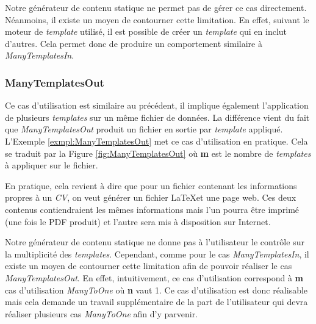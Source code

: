 			\begin{note}
				Notre générateur de contenu statique ne permet pas de gérer ce cas directement. Néanmoins, il existe un moyen de contourner cette limitation. En effet, suivant le moteur de \textit{template} utilisé, il est possible de créer un \textit{template} qui en inclut d'autres. Cela permet donc de produire un comportement similaire à \textit{ManyTemplatesIn}.
			\end{note}
			
		
		\subsubsection*{ManyTemplatesOut}
		
			Ce cas d'utilisation est similaire au précédent, il implique également l'application de plusieurs \textit{templates} sur un même fichier de données. La différence vient du fait que \textit{ManyTemplatesOut} produit un fichier en sortie par \textit{template} appliqué. L'Exemple \ref{exmpl:ManyTemplatesOut} met ce cas d'utilisation en pratique. Cela se traduit par la Figure \ref{fig:ManyTemplatesOut} où \textbf{m} est le nombre de \textit{templates} à appliquer sur le fichier.
			
			\begin{exmpl}
				\label{exmpl:ManyTemplatesOut}
				En pratique, cela revient à dire que pour un fichier contenant les informations propres à un \textit{CV}, on veut générer un fichier \LaTeX et une page web. Ces deux contenus contiendraient les mêmes informations mais l'un pourra être imprimé (une fois le PDF produit) et l'autre sera mis à disposition sur Internet.
			\end{exmpl}
			
			\begin{note}
				Notre générateur de contenu statique ne donne pas à l'utilisateur le contrôle sur la multiplicité des \textit{templates}. Cependant, comme pour le cas \textit{ManyTemplatesIn}, il existe un moyen de contourner cette limitation afin de pouvoir réaliser le cas \textit{ManyTemplatesOut}. En effet, intuitivement, ce cas d'utilisation correspond à \textbf{m} cas d'utilisation \textit{ManyToOne} où \textbf{n} vaut 1. Ce cas d'utilisation est donc réalisable mais cela demande un travail supplémentaire de la part de l'utilisateur qui devra réaliser plusieurs cas \textit{ManyToOne} afin d'y parvenir.
			\end{note}
			
